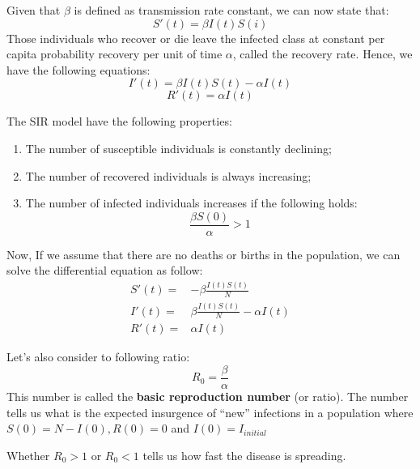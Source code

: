 Given that $\beta$ is defined as transmission rate constant, we can now 
state that:
\begin{equation}
    S'(t) = \beta I(t) S(i)
\end{equation}
Those individuals who recover or die leave the infected class at constant 
per capita probability recovery per unit of time $\alpha$, called the 
recovery rate. Hence, we have the following equations:
\begin{equation}
    I'(t) = \beta I(t)S(t) - \alpha I(t)
\end{equation}
\begin{equation}
    R'(t) = \alpha I(t)
\end{equation}

The SIR model have the following properties:
\begin{enumerate}
    \item The number of susceptible individuals is constantly declining;
    \item The number of recovered individuals is always increasing;
    \item The number of infected individuals increases if the following holds:
    \begin{equation*}
        \frac{\beta S(0)}{\alpha} > 1
    \end{equation*}
\end{enumerate}

Now, If we assume that there are no deaths or births in the population, we can solve
the differential equation as follow:
\begin{equation}
    \begin{array}{lc}
        S'(t) = & - \beta \frac{I(t)S(t)}{N} \\ 
        I'(t) = & \beta \frac{I(t)S(t)}{N} - \alpha I(t) \\
        R'(t) = & \alpha I(t)
    \end{array}
\end{equation}

Let's also consider to following ratio:
\begin{equation*}
    R_0 = \frac{\beta}{\alpha}
\end{equation*}
This number is called the \textbf{basic reproduction number} (or ratio). 
The number tells us what is the expected insurgence of “new” infections 
in a population where $S(0) = N - I(0), R(0) = 0$ and $I(0) = I_{initial}$

Whether $R_0 > 1$ or $R_0 < 1$ tells us how fast the disease is spreading.

